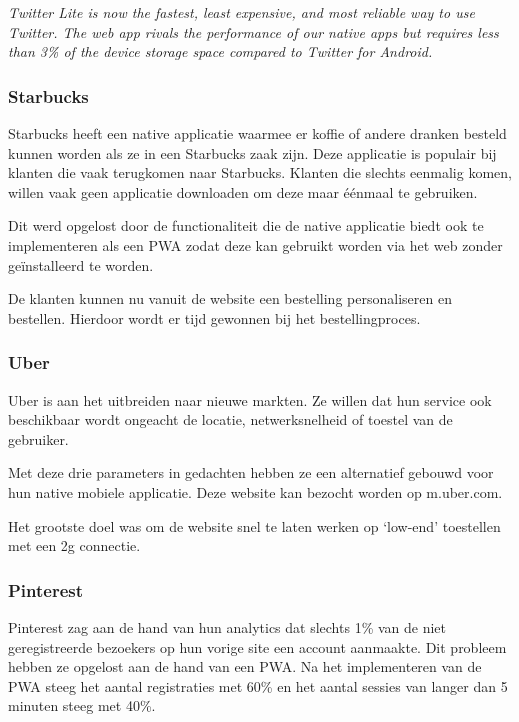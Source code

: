 \textit{Twitter Lite is now the fastest, least expensive, and most reliable way to use Twitter. The web app rivals the performance of our native apps but requires less than 3\% of the device storage space compared to Twitter for Android.}

\autocite{Developers2020a}
\autocite{Love2018}

\subsubsection{Starbucks}

Starbucks heeft een native applicatie waarmee er koffie of andere dranken besteld kunnen worden als ze in een Starbucks zaak zijn. Deze applicatie is populair bij klanten die vaak terugkomen naar Starbucks. Klanten die slechts eenmalig komen, willen vaak geen applicatie downloaden om deze maar éénmaal te gebruiken.

Dit werd opgelost door de functionaliteit die de native applicatie biedt ook te implementeren als een PWA zodat deze kan gebruikt worden via het web zonder geïnstalleerd te worden.

De klanten kunnen nu vanuit de website een bestelling personaliseren en bestellen. Hierdoor wordt er tijd gewonnen bij het bestellingproces.

\autocite{Formidable2020}
\autocite{Kawatka2020}

\subsubsection{Uber}

Uber is aan het uitbreiden naar nieuwe markten. Ze willen dat hun service ook beschikbaar wordt ongeacht de locatie, netwerksnelheid of toestel van de gebruiker.

Met deze drie parameters in gedachten hebben ze een alternatief gebouwd voor hun native mobiele applicatie. Deze website kan bezocht worden op m.uber.com.

Het grootste doel was om de website snel te laten werken op ‘low-end’ toestellen met een 2g connectie. 

\autocite{Croll2017}

\subsubsection{Pinterest}

Pinterest zag aan de hand van hun analytics dat slechts 1\% van de niet geregistreerde bezoekers op hun vorige site een account aanmaakte. Dit probleem hebben ze opgelost aan de hand van een PWA.
Na het implementeren van de PWA steeg het aantal registraties met 60\% en het aantal sessies van langer dan 5 minuten steeg met 40\%.

\autocite{Osmani2019b}




